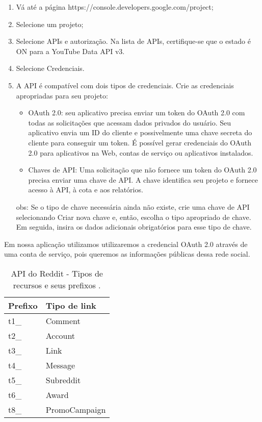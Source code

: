 \begin{enumerate}
    \item Vá até a página https://console.developers.google.com/project;
    \item Selecione um projeto;
    \item Selecione APIs e autorização. Na lista de APIs, certifique-se que o estado é ON para a YouTube Data API v3.
    \item Selecione Credenciais.
    \item A API é compatível com dois tipos de credenciais. Crie as credenciais apropriadas para seu projeto:
    \begin{itemize}
    	\item OAuth 2.0: seu aplicativo precisa enviar um token do OAuth 2.0 com todas as solicitações que acessam dados privados do usuário. Seu aplicativo envia um ID do cliente e possivelmente uma chave secreta do cliente para conseguir um token. É possível gerar credenciais do OAuth 2.0 para aplicativos na Web, contas de serviço ou aplicativos instalados.
    	\item Chaves de API: Uma solicitação que não fornece um token do OAuth 2.0 precisa enviar uma chave de API. A chave identifica seu projeto e fornece acesso à API, à cota e aos relatórios.
    \end{itemize}
    obs: Se o tipo de chave necessária ainda não existe, crie uma chave de API selecionando Criar nova chave e, então, escolha o tipo apropriado de chave. Em seguida, insira os dados adicionais obrigatórios para esse tipo de chave.
\end{enumerate} 

Em nossa aplicação utilizamos utilizaremos a credencial OAuth 2.0 através de uma conta de serviço, pois queremos as informações públicas dessa rede social.

\begin{table}[ht]
\centering
\begin{tabular}{|p{2cm}|p{3cm}|}
\hline
\rowcolor[HTML]{CFCFCF} 
Prefixo	&	Tipo de link	\\ \hline
t1\_	    &	Comment	        \\ \hline
t2\_	    &	Account	        \\ \hline
t3\_	    &	Link	        \\ \hline
t4\_	    &	Message	        \\ \hline
t5\_	    &	Subreddit	    \\ \hline
t6\_	    &	Award         	\\ \hline
t8\_	    &	PromoCampaign	\\ \hline
\end{tabular}
\caption[API do Reddit - Tipos de recursos e seus prefixos]{API do Reddit - Tipos de recursos e seus prefixos \cite{RedditAPI}.}
\label{fig: RecursosReddit}
\end{table}
 
